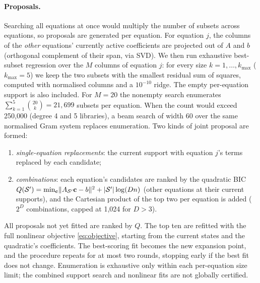 \paragraph{Proposals.} Searching all equations at once would multiply the number of subsets across equations, so proposals are generated per equation. For equation $j$, the columns of the \emph{other} equations' currently active coefficients are projected out of $A$ and $b$ (orthogonal complement of their span, via SVD). We then run exhaustive best-subset regression over the $M$ columns of equation $j$: for every size $k=1,\dots,k_{\max}$ ($k_{\max}=5$) we keep the two subsets with the smallest residual sum of squares, computed with normalised columns and a $10^{-10}$ ridge. The empty per-equation support is also included. For $M=20$ the nonempty search enumerates $\sum_{k=1}^{5}\binom{20}{k}=21{,}699$ subsets per equation. When the count would exceed 250{,}000 (degree 4 and 5 libraries), a beam search of width 60 over the same normalised Gram system replaces enumeration. Two kinds of joint proposal are formed:
\begin{enumerate}[leftmargin=*,itemsep=1pt]
\item \emph{single-equation replacements}: the current support with equation $j$'s terms replaced by each candidate;
\item \emph{combinations}: each equation's candidates are ranked by the quadratic BIC $Q(\mathcal{S}')=\min_{\mathbf{c}}\lVert A_{\mathcal{S}'}\mathbf{c}-b\rVert^2+|\mathcal{S}'|\log(Dn)$ (other equations at their current supports), and the Cartesian product of the top two per equation is added ($2^D$ combinations, capped at 1{,}024 for $D>3$).
\end{enumerate}
All proposals not yet fitted are ranked by $Q$. The top ten are refitted with the full nonlinear objective \eqref{eq:objective}, starting from the current states and the quadratic's coefficients. The best-scoring fit becomes the new expansion point, and the procedure repeats for at most two rounds, stopping early if the best fit does not change. Enumeration is exhaustive only within each per-equation size limit; the combined support search and nonlinear fits are not globally certified.

